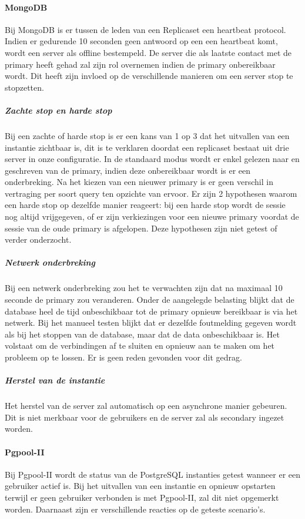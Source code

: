 \paragraph{MongoDB} Bij MongoDB is er tussen de leden van een Replicaset een heartbeat protocol. Indien er gedurende 10 seconden geen antwoord op een een heartbeat komt, wordt een server als offline bestempeld. De server die als laatste contact met de primary heeft gehad zal zijn rol overnemen indien de primary onbereikbaar wordt\cite{mongodb-manual}. Dit heeft zijn invloed op de verschillende manieren om een server stop te stopzetten. 

\subparagraph{Zachte stop en harde stop} Bij een zachte of harde stop is er een kans van 1 op 3 dat het uitvallen van een instantie zichtbaar is, dit is te verklaren doordat een replicaset bestaat uit drie server in onze configuratie. In de standaard modus wordt er enkel gelezen naar en geschreven van de primary, indien deze onbereikbaar wordt is er een onderbreking. Na het kiezen van een nieuwer primary is er geen verschil in vertraging per soort query ten opzichte van ervoor. Er zijn 2 hypothesen waarom een harde stop op dezelfde manier reageert: bij een harde stop wordt de sessie nog altijd vrijgegeven, of er zijn verkiezingen voor een nieuwe primary voordat de sessie van de oude primary is afgelopen. Deze hypothesen zijn niet getest of verder onderzocht. 

\subparagraph{Netwerk onderbreking} Bij een netwerk onderbreking zou het te verwachten zijn dat na maximaal 10 seconde de primary zou veranderen. Onder de aangelegde belasting blijkt dat de database heel de tijd onbeschikbaar tot de primary opnieuw bereikbaar is via het netwerk. Bij het manueel testen blijkt dat er dezelfde foutmelding gegeven wordt als bij het stoppen van de database, maar dat de data onbeschikbaar is. Het volstaat om de verbindingen af te sluiten en opnieuw aan te maken om het probleem op te lossen. Er is geen reden gevonden voor dit gedrag. 

\subparagraph{Herstel van de instantie} Het herstel van de server zal automatisch op een asynchrone manier gebeuren. Dit is niet merkbaar voor de gebruikers en de server zal als secondary ingezet worden. 

\paragraph{Pgpool-II} Bij Pgpool-II wordt de status van de PostgreSQL instanties getest wanneer er een gebruiker actief is.  Bij het uitvallen van een instantie en opnieuw opstarten terwijl er geen gebruiker verbonden is met Pgpool-II, zal dit niet opgemerkt worden. Daarnaast zijn er verschillende reacties op de geteste scenario's. 

